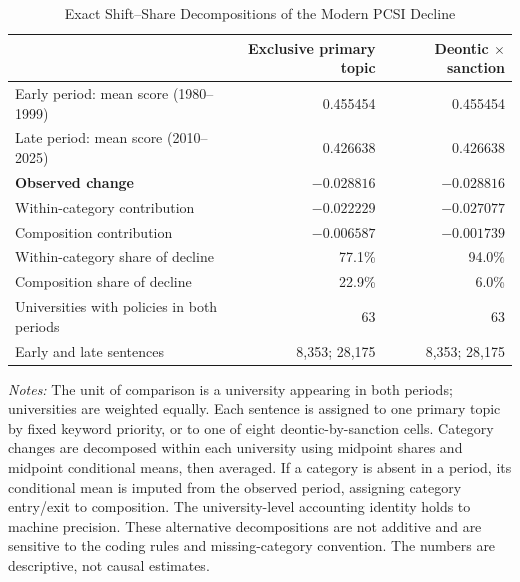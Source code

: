 \begin{table}[htbp]
\centering
\small
\caption{Exact Shift--Share Decompositions of the Modern PCSI Decline}
\label{tab:decomp}
\begin{threeparttable}
\begin{tabular}{lrr}
\toprule
 & Exclusive primary topic & Deontic $\times$ sanction \\
\midrule
Early period: mean score (1980--1999) & 0.455454 & 0.455454 \\
Late period: mean score (2010--2025) & 0.426638 & 0.426638 \\
\textbf{Observed change} & \textbf{$-0.028816$} & \textbf{$-0.028816$} \\
Within-category contribution & $-0.022229$ & $-0.027077$ \\
Composition contribution & $-0.006587$ & $-0.001739$ \\
Within-category share of decline & 77.1\% & 94.0\% \\
Composition share of decline & 22.9\% & 6.0\% \\
Universities with policies in both periods & 63 & 63 \\
Early and late sentences & 8,353; 28,175 & 8,353; 28,175 \\
\bottomrule
\end{tabular}
\begin{tablenotes}[flushleft]\footnotesize
\item \textit{Notes:} The unit of comparison is a university appearing in both periods; universities are weighted equally. Each sentence is assigned to one primary topic by fixed keyword priority, or to one of eight deontic-by-sanction cells. Category changes are decomposed within each university using midpoint shares and midpoint conditional means, then averaged. If a category is absent in a period, its conditional mean is imputed from the observed period, assigning category entry/exit to composition. The university-level accounting identity holds to machine precision. These alternative decompositions are not additive and are sensitive to the coding rules and missing-category convention. The numbers are descriptive, not causal estimates.
\end{tablenotes}
\end{threeparttable}
\end{table}
